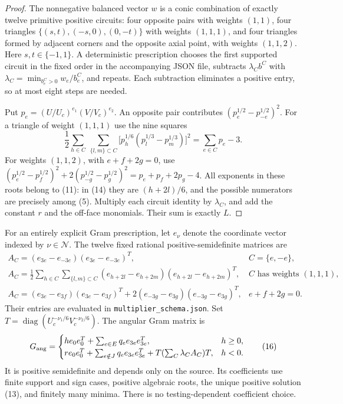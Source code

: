 \documentclass[11pt]{article}
\newcommand{\diag}{\operatorname{diag}}
\begin{document}
\begin{proof}
The nonnegative balanced vector $w$ is a conic combination of exactly
twelve primitive positive circuits: four opposite pairs with weights
$(1,1)$, four triangles
$\{(s,t),(-s,0),(0,-t)\}$ with weights $(1,1,1)$, and four triangles
formed by adjacent corners and the opposite axial point, with weights
$(1,1,2)$.  Here $s,t\in\{-1,1\}$.
A deterministic prescription chooses the first supported circuit in
the fixed order in the accompanying JSON file, subtracts
$\lambda_C b^C$ with
$\lambda_C=\min_{b_e^C>0} w_e/b_e^C$, and repeats.  Each subtraction
eliminates a positive entry, so at most eight steps are needed.

Put $p_e=(U/U_c)^{e_1}(V/V_c)^{e_2}$.
An opposite pair contributes $(p_e^{1/2}-p_{-e}^{1/2})^2$.
For a triangle of weight $(1,1,1)$ use the nine squares
\[
 \frac12\sum_{h\in C}\ \sum_{\{l,m\}\subset C}
       \bigl[p_h^{1/6}(p_l^{1/3}-p_m^{1/3})\bigr]^2
                         =\sum_{e\in C}p_e-3.        \tag{14}
\]
For weights $(1,1,2)$, with $e+f+2g=0$, use
$(p_e^{1/2}-p_f^{1/2})^2+2(p_{-g}^{1/2}-p_g^{1/2})^2
=p_e+p_f+2p_g-4$.
All exponents in these roots belong to (11): in (14) they are
$(h+2l)/6$, and the possible numerators are precisely among (5).
Multiply each circuit identity by $\lambda_C$, and add the constant
$r$ and the off-face monomials.  Their sum is exactly $L$.
\end{proof}

For an entirely explicit Gram prescription, let $e_\nu$ denote the
coordinate vector indexed by $\nu\in\mathcal N$.  The twelve fixed
rational positive-semidefinite matrices are
\[
\begin{array}{ll}
A_C=(e_{3e}-e_{-3e})(e_{3e}-e_{-3e})^T,
     &C=\{e,-e\},\\[2mm]
A_C=\frac12\displaystyle\sum_{h\in C}\sum_{\{l,m\}\subset C}
 (e_{h+2l}-e_{h+2m})(e_{h+2l}-e_{h+2m})^T,
     &C\text{ has weights }(1,1,1),\\[2mm]
A_C=(e_{3e}-e_{3f})(e_{3e}-e_{3f})^T
 +2(e_{-3g}-e_{3g})(e_{-3g}-e_{3g})^T,
     &e+f+2g=0.
\end{array}                                                        \tag{15}
\]
Their entries are evaluated in \texttt{multiplier\_schema.json}.
Set $T=\diag(U_c^{-\nu_1/6}V_c^{-\nu_2/6})$.  The angular Gram matrix is
\[
 G_{\rm ang}=
 \begin{cases}
 h e_0e_0^T+\sum_{e\in E}q_e e_{3e}e_{3e}^T,&h\geq0,\\
 r e_0e_0^T+\sum_{e\notin J}q_e e_{3e}e_{3e}^T
       +T(\sum_C\lambda_CA_C)T,&h<0.
 \end{cases}                                                     \tag{16}
\]
It is positive semidefinite and depends only on the source.  Its
coefficients use finite support and sign cases, positive algebraic
roots, the unique positive solution (13), and finitely many minima.
There is no testing-dependent coefficient choice.
\end{document}

